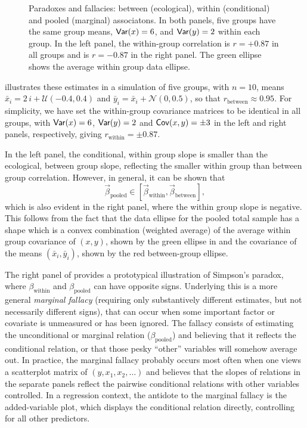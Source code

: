 \begin{figure}[htb]
\begin{minipage}[b]{.49\linewidth}
 \end{minipage}
  \caption{Paradoxes and fallacies: between (ecological), within (conditional) and pooled (marginal) associatons.
  In both panels, five groups have the same group means, $\mathsf{Var}(x)=6$, and $\mathsf{Var}(y)=2$ within each group.
  In the left panel, the within-group correlation is $r = +0.87$ in all groups and is $r = -0.87$ in the right panel.
  The green ellipse shows the average within group data ellipse.}
  \label{fig:between-within}
\end{figure}
 
 illustrates these estimates in a simulation of five groups, with $n=10$,  means 
$\bar{x}_i = 2 \, i + \mathcal{U}(-0.4, 0.4)$  and
$\bar{y}_i = \bar{x}_i + \mathcal{N}(0, 0.5)$, so that $r_{\textrm{between}} \approx 0.95$.
For simplicity, we have set the within-group covariance matrices to be identical in all groups, with
$\mathsf{Var}(x)=6$, $\mathsf{Var}(y)=2$ and $\mathsf{Cov}(x,y)=\pm 3$ in the left and right panels, respectively, giving
$r_{\textrm{within}} = \pm 0.87$.

In the left panel, the conditional, within group slope is smaller than the ecological, between group slope,
reflecting the smaller within group than between group correlation.
However, in general, it can be shown that
\begin{equation*}
\vec{\beta}_{\textrm{pooled}} \in [\vec{\beta}_{\textrm{within}} , \vec{\beta}_{\textrm{between}} ] \comma
\end{equation*}
which is also evident in the right panel, where the within group slope is negative.
This follows from the fact that the data ellipse for the pooled total sample
has a shape which is a convex combination (weighted average) of the average within group
covariance of $(x, y)$, shown by the green ellipse in     
and the  covariance of the means $(\bar{x}_i, \bar{y}_i)$, shown by the red between-group ellipse.                                                                        

The right panel of  provides a prototypical illustration of Simpson's paradox,
where $\beta_{\textrm{within}}$ and $\beta_{\textrm{pooled}}$ can have opposite signs. Underlying this is a
more general \emph{marginal fallacy} (requiring only substantively different estimates, but not necessarily
different signs), 
that can occur when some important factor or covariate is unmeasured
or has been ignored. The fallacy consists of estimating the unconditional or marginal
relation ($\beta_{\textrm{pooled}}$) and believing that it reflects the conditional relation, or that
those pesky ``other'' variables will somehow average out. In practice, the marginal fallacy probably occurs most
often when one views a scatterplot matrix of $(y, x_1, x_2, \dots)$ and believes that the slopes of
relations in the separate panels reflect the pairwise conditional relations with other variables
controlled. In a regression context, the antidote to the marginal fallacy is the added-variable
plot, which displays the conditional relation directly, controlling for all other predictors.

